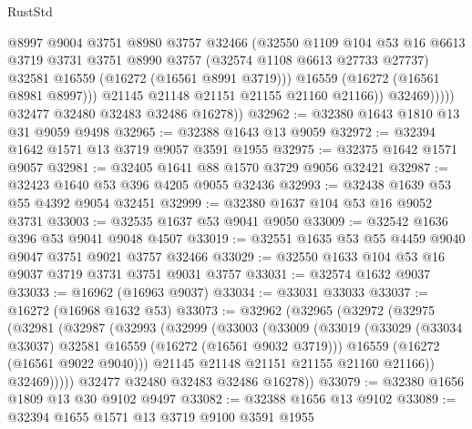 \begin{lexlean}{RustStd}
\begin{coremodule}
                        @8997
                        @9004
                        @3751
                        @8980
                        @3757
                        @32466
                        (@32550
                          @1109
                          @104
                          @53
                          @16
                          @6613
                          @3719
                          @3731
                          @3751
                          @8990
                          @3757
                          (@32574 @1108 @6613 @27733 @27737)
                          @32581
                          @16559
                          (@16272 (@16561 @8991 @3719)))
                        @16559
                        (@16272 (@16561 @8981 @8997)))
                      @21145
                      @21148
                      @21151
                      @21155
                      @21160
                      @21166))
                  @32469)))))
        @32477
        @32480
        @32483
        @32486
        @16278))
@32962 := @32380 @1643 @1810 @13 @31 @9059 @9498
@32965 := @32388 @1643 @13 @9059
@32972 := @32394 @1642 @1571 @13 @3719 @9057 @3591 @1955
@32975 := @32375 @1642 @1571 @9057
@32981 := @32405 @1641 @88 @1570 @3729 @9056 @32421
@32987 := @32423 @1640 @53 @396 @4205 @9055 @32436
@32993 := @32438 @1639 @53 @55 @4392 @9054 @32451
@32999 := @32380 @1637 @104 @53 @16 @9052 @3731
@33003 := @32535 @1637 @53 @9041 @9050
@33009 := @32542 @1636 @396 @53 @9041 @9048 @4507
@33019 := @32551 @1635 @53 @55 @4459 @9040 @9047 @3751 @9021 @3757 @32466
@33029 := @32550 @1633 @104 @53 @16 @9037 @3719 @3731 @3751 @9031 @3757
@33031 := @32574 @1632 @9037
@33033 := @16962 (@16963 @9037)
@33034 := @33031 @33033
@33037 := @16272 (@16968 @1632 @53)
@33073 := @32962
    (@32965
      (@32972
        (@32975
          (@32981
            (@32987
              (@32993
                (@32999
                  (@33003
                    (@33009
                      (@33019
                        (@33029 (@33034 @33037) @32581 @16559 (@16272 (@16561 @9032 @3719)))
                        @16559
                        (@16272 (@16561 @9022 @9040)))
                      @21145
                      @21148
                      @21151
                      @21155
                      @21160
                      @21166))
                  @32469)))))
        @32477
        @32480
        @32483
        @32486
        @16278))
@33079 := @32380 @1656 @1809 @13 @30 @9102 @9497
@33082 := @32388 @1656 @13 @9102
@33089 := @32394 @1655 @1571 @13 @3719 @9100 @3591 @1955

\end{coremodule}
\end{lexlean}
